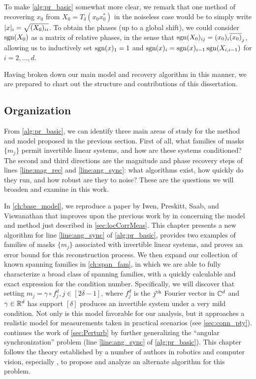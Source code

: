 To make \cref{alg:pr_basic} somewhat more clear, we remark that one method of recovering $x_0$ from $X_0 = T_\delta(x_0 x_0^*)$ in the noiseless case would be to simply write $\lvert x\rvert_i = \sqrt{(X_0)_{ii}}$.  To obtain the phases (up to a global shift), we could consider $\operatorname{sgn}(X_0)$ as a matrix of relative phases, in the sense that $\operatorname{sgn}(X_0)_{ij} = (x_0)_i \overline{(x_0)}_j$, allowing us to inductively set $\operatorname{sgn}(x)_1 = 1$ and $\operatorname{sgn}(x)_i = \operatorname{sgn}(x)_{i-1} \operatorname{sgn}(X_{i, i-1})$ for $i = 2,\ldots, d$.

Having broken down our main model and recovery algorithm in this manner, we are prepared to chart out the structure and contributions of this dissertation.

\subsection{Organization}
\label{sec:organization}

From \cref{alg:pr_basic}, we can identify three main areas of study for the method and model proposed in the previous section.  First of all, what families of masks $\{m_j\}$ permit invertible linear systems, and how are these systems conditioned?  The second and third directions are the magnitude and phase recovery steps of lines \ref{line:mag_rec} and \ref{line:ang_sync}: what algorithms exist, how quickly do they run, and how robust are they to noise?  These are the questions we will broaden and examine in this work.

In \cref{ch:base_model}, we reproduce a paper by Iwen, Preskitt, Saab, and Viswanathan that improves upon the previous work by \citeauthor*{IVW2015_FastPhase} in \cite{IVW2015_FastPhase} concerning the model and method just described in \cref{sec:locCorrMeas}.  This chapter presents a new algorithm for line \ref{line:ang_sync} of \cref{alg:pr_basic}, provides two examples of families of masks $\{m_j\}$ associated with invertible linear systems, and proves an error bound for this reconstruction process.  We then expand our collection of known spanning families in \cref{ch:span_fam}, in which we are able to fully characterize a broad class of spanning families, with a quickly calculable and exact expression for the condition number.  Specifically, we will discover that setting $m_j = \gamma \circ f_j^d, j \in [2 \delta - 1]$, where $f_j^d$ is the $j^{\text{th}}$ Fourier vector in $\mathbb{C}^d$ and $\gamma \in \mathbb{R}^d$ has support $[\delta]$ produces an invertible system under a very mild condition.  Not only is this model favorable for our analysis, but it approaches a realistic model for measurements taken in practical scenarios (see \cref{sec:conn_pty}).   continues the work of \cref{sec:Perturb} by further generalizing the ``angular synchronization'' problem (line \ref{line:ang_sync} of \cref{alg:pr_basic}).  This chapter follows the theory established by a number of authors in robotics and computer vision, especially \cite{calafiore2016complex_pgo,bandeira2016se_sync}, to propose and analyze an alternate algorithm for this problem.

